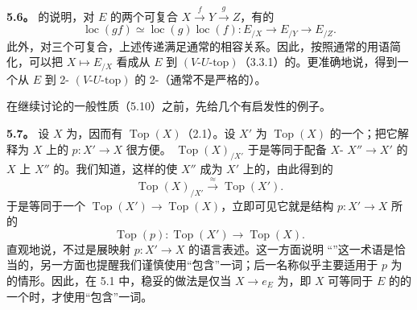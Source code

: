 \textbf{5.6。} 的说明，对 $E$ 的两个可复合 $X\xrightarrow fY\xrightarrow gZ$，有的
\[\operatorname{loc}(gf)\simeq\operatorname{loc}(g)\operatorname{loc}(f):E_{/X}\longrightarrow E_{/Y}\longrightarrow E_{/Z}.\]
此外，对三个可复合，上述传递满足通常的相容关系。因此，按照通常的用语简化，可以把 $X\mapsto E_{/X}$ 看成从 $E$ 到 $(V\text{-}U\text{-}\mathrm{top})$（3.3.1）的。更准确地说，得到一个从 $E$ 到 2- $(V\text{-}U\text{-}\mathrm{top})$ 的 2-（通常不是严格的）。

在继续讨论的一般性质（5.10）之前，先给几个有启发性的例子。

\textbf{5.7。} 设 $X$ 为，因而有 $\operatorname{Top}(X)$（2.1）。设 $X'$ 为 $\operatorname{Top}(X)$ 的一个；把它解释为 $X$ 上的 $p:X'\to X$ 很方便。 $\operatorname{Top}(X)_{/X'}$ 于是等同于配备 $X$- $X''\to X'$ 的 $X$ 上 $X''$ 的。我们知道，这样的使 $X''$ 成为 $X'$ 上的，由此得到的
\[\operatorname{Top}(X)_{/X'}\xrightarrow{\approx}\operatorname{Top}(X').\]
于是等同于一个 $\operatorname{Top}(X')\to\operatorname{Top}(X)$，立即可见它就是结构 $p:X'\to X$ 所的
\[\operatorname{Top}(p):\operatorname{Top}(X')\longrightarrow\operatorname{Top}(X).\]
直观地说，不过是展映射 $p:X'\to X$ 的语言表述。这一方面说明
“”这一术语是恰当的，另一方面也提醒我们谨慎使用“包含”一词；后一名称似乎主要适用于 $p$ 为的情形。因此，在 5.1 中，稳妥的做法是仅当 $X\to e_E$ 为，即 $X$ 可等同于 $E$ 的的一个时，才使用“包含”一词。

